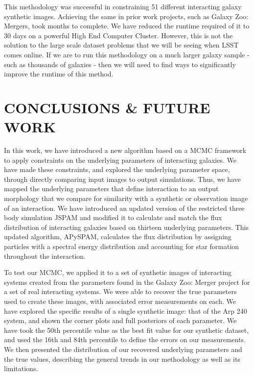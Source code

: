 This methodology was successful in constraining 51 different interacting galaxy synthetic images. Achieving the same in prior work projects, such as Galaxy Zoo: Mergers, took months to complete. We have reduced the runtime required of it to 30 days on a powerful High End Computer Cluster. However, this is not the solution to the large scale dataset problems that we will be seeing when LSST comes online. If we are to run this methodology on a much larger galaxy sample - such as thousands of galaxies - then we will need to find ways to significantly improve the runtime of this method.

\section{CONCLUSIONS \& FUTURE WORK}\label{Conclusions}
\noindent In this work, we have introduced a new algorithm based on a MCMC framework to apply constraints on the underlying parameters of interacting galaxies. We have made these constraints, and explored the underlying parameter space, through directly comparing input images to output simulations. Thus, we have mapped the underlying parameters that define interaction to an output morphology that we compare for similarity with a synthetic or observation image of an interaction. We have introduced an updated version of the restricted three body simulation JSPAM and modified it to calculate and match the flux distribution of interacting galaxies based on thirteen underlying parameters. This updated algorithm, APySPAM, calculates the flux distribution by assigning particles with a spectral energy distribution and accounting for star formation throughout the interaction. 

To test our MCMC, we applied it to a set of synthetic images of interacting systems created from the parameters found in the Galaxy Zoo: Merger project for a set of real interacting systems. We were able to recover the true parameters used to create these images, with associated error measurements on each. We have explored the specific results of a single synthetic image: that of the Arp 240 system, and shown the corner plots and full posteriors of each parameter. We have took the 50th percentile value as the best fit value for our synthetic dataset, and used the 16th and 84th percentile to define the errors on our measurements. We then presented the distribution of our recovered underlying parameters and the true values, describing the general trends in our methodology as well as its limitations. 

